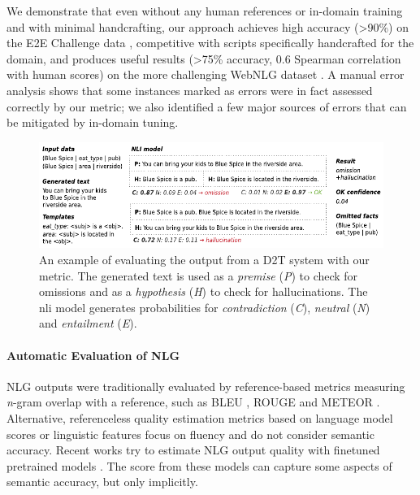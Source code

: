 We demonstrate that even without any human references or in-domain training and with minimal handcrafting, our approach achieves high accuracy (>90\%) on the E2E Challenge data \cite{duvsek2020evaluating}, competitive with scripts specifically handcrafted for the domain, and produces useful results (>75\% accuracy, 0.6 Spearman correlation with human scores)
on the more challenging WebNLG dataset \cite{gardent2017webnlg}. A manual error analysis shows that some instances marked as errors were in fact assessed correctly by our metric; we also identified a few major sources of errors that can be mitigated by in-domain tuning.

\begin{figure}[t]
    \centering
    \includegraphics[width=\textwidth]{img/2020_nli_inlg}
    \caption{An example of evaluating the output from a D2T system with our metric. The generated text is used as a \textit{premise} (\textit{P}) to check for omissions and as a \textit{hypothesis} (\textit{H}) to check for hallucinations. The \ac{nli} model generates probabilities for \textit{contradiction} (\textit{C}), \textit{neutral} (\textit{N}) and \textit{entailment} (\textit{E}).}
    \label{fig:sem-acc:ex}
\end{figure}
\paragraph{Automatic Evaluation of NLG} NLG outputs were traditionally evaluated by reference-based metrics measuring \emph{n}-gram overlap with a reference, such as BLEU \cite{papineni-etal-2002-bleu}, ROUGE \cite{lin-2004-rouge} and METEOR \cite{lavie_meteor:_2007}. Alternative, referenceless quality estimation metrics based on language model scores \cite{kann_sentence-level_2018} or linguistic features \cite{tian_treat_2018} focus on fluency and do not consider semantic accuracy. Recent works try to estimate NLG output quality with finetuned pretrained models \cite{zhou_learning_2020,zhang_bertscore:_2020,sellam_bleurt_2020}. The score from these models can capture some aspects of semantic accuracy, but only implicitly.

